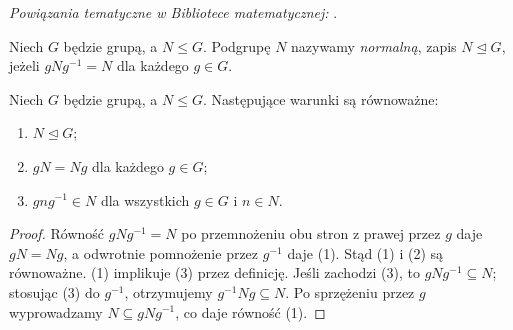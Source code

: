 \noindent\emph{Powiązania tematyczne w Bibliotece matematycznej:} .

\begin{definicja}
\label{aa:def:normalna}
Niech $G$ będzie grupą, a $N\le G$. Podgrupę $N$
nazywamy \emph{normalną}, zapis $N\trianglelefteq G$,
jeżeli $gNg^{-1}=N$ dla każdego $g\in G$.
\end{definicja}

\begin{twierdzenie}
\label{aa:tw:normalna-warstwy}
Niech $G$ będzie grupą, a $N\le G$.
Następujące warunki są równoważne:
\begin{enumerate}
\item $N\trianglelefteq G$;
\item $gN=Ng$ dla każdego $g\in G$;
\item $gng^{-1}\in N$ dla wszystkich $g\in G$ i $n\in N$.
\end{enumerate}
\end{twierdzenie}
\begin{proof}
Równość $gNg^{-1}=N$ po przemnożeniu obu stron z prawej
przez $g$ daje $gN=Ng$, a odwrotnie pomnożenie przez $g^{-1}$
daje (1). Stąd (1) i (2) są równoważne.
(1) implikuje (3) przez definicję. Jeśli zachodzi (3),
to $gNg^{-1}\subseteq N$; stosując (3) do $g^{-1}$,
otrzymujemy $g^{-1}Ng\subseteq N$. Po sprzężeniu przez $g$
wyprowadzamy $N\subseteq gNg^{-1}$, co daje równość (1).
\end{proof}

